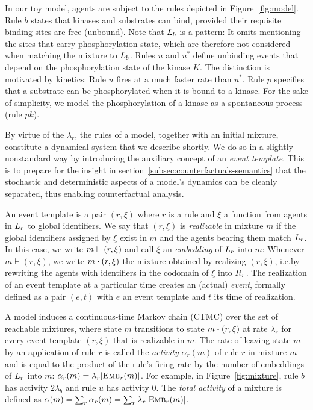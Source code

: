 

In our toy model, agents are subject to the rules depicted in
Figure~\ref{fig:model}. Rule $b$ states that kinases and substrates
can bind, provided their requisite binding sites are free
(unbound). Note that $L_{b}$ is a pattern: It omits mentioning the
sites that carry phosphorylation state, which are therefore not
considered when matching the mixture to $L_{b}$. Rules $u$ and
$u^{*}$ define unbinding events that depend on the phosphorylation
state of the kinase $K$. The distinction is motivated by kinetics:
Rule $u$ fires at a much faster rate than $u^{*}$. Rule $p$ specifies
that a substrate can be phosphorylated when it is bound to a
kinase. For the sake of simplicity, we model the phosphorylation of a
kinase as a spontaneous process (rule $pk$).

By virtue of the $\lambda_r$, the rules of a model, together with an
initial mixture, constitute a dynamical system that we describe
shortly. We do so in a slightly nonstandard way by introducing the
auxiliary concept of an \emph{event template}. This is to prepare for
the insight in section~\ref{subsec:counterfactuals-semantics} that the
stochastic and deterministic aspects of a model's dynamics can be
cleanly separated, thus enabling counterfactual analysis.

An event template is a pair $(r, \xi)$ where $r$ is a rule and $\xi$ a
function from agents in $L_{r}$ to global identifiers. We say that
$(r, \xi)$ is \emph{realizable} in mixture $m$ if the global
identifiers assigned by $\xi$ exist in $m$ and the agents bearing them
match $L_{r}$. In this case, we write $m \vdash (r, \xi)$
and call $\xi$ an \emph{embedding} of
$L_{r}$ into $m$:
  Whenever $m \vdash (r, \xi)$, we
write $\UPDATE{m}{(r, \xi)}$ the mixture obtained by
realizing $(r, \xi)$, i.e.\@ by rewriting the agents with identifiers
in the codomain of $\xi$ into $R_{r}$. The realization of an event
template at a particular time creates an (actual) \emph{event},
formally defined as a pair $(e, t)$ with $e$ an event template and $t$
its time of realization.

A model induces a continuous-time Markov chain (CTMC) over the
set of reachable mixtures, where state $m$ transitions to state
$\UPDATE{m}{(r, \xi)}$ at rate $\lambda_r$ for every event template
$(r, \xi)$ that is realizable in $m$. The rate of leaving state $m$ by
an application of rule $r$ is called the \emph{activity} $\alpha_r(m)$
of rule $r$ in
mixture $m$ and is equal to the product of the rule's firing rate by
the number of embeddings of $L_{r}$ into $m$:
$\alpha_r(m)=\lambda_r|{\textsc{Emb}}_{r}(m)|$. For example, in
Figure~\ref{fig:mixture}, rule $b$ has activity $2\lambda_b$ and rule
$u$ has activity $0$. The \emph{total activity} of a mixture is defined
as $\alpha(m)=\sum_r\alpha_r(m)=\sum_r\lambda_r|{\textsc{Emb}}_{r}(m)|$.

